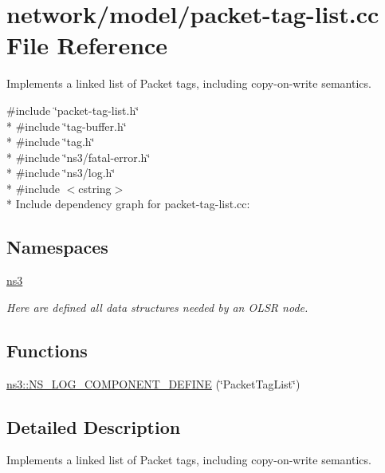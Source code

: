 \hypertarget{packet-tag-list_8cc}{}\section{network/model/packet-\/tag-\/list.cc File Reference}
\label{packet-tag-list_8cc}


Implements a linked list of Packet tags, including copy-\/on-\/write semantics.  


{\ttfamily \#include \char`\"{}packet-\/tag-\/list.\+h\char`\"{}}\\*
{\ttfamily \#include \char`\"{}tag-\/buffer.\+h\char`\"{}}\\*
{\ttfamily \#include \char`\"{}tag.\+h\char`\"{}}\\*
{\ttfamily \#include \char`\"{}ns3/fatal-\/error.\+h\char`\"{}}\\*
{\ttfamily \#include \char`\"{}ns3/log.\+h\char`\"{}}\\*
{\ttfamily \#include $<$cstring$>$}\\*
Include dependency graph for packet-\/tag-\/list.cc\+:
\subsection*{Namespaces}
\begin{DoxyCompactItemize}
\item 
 \hyperlink{namespacens3}{ns3}
\begin{DoxyCompactList}\small\item\em Here are defined all data structures needed by an O\+L\+SR node. \end{DoxyCompactList}\end{DoxyCompactItemize}
\subsection*{Functions}
\begin{DoxyCompactItemize}
\item 
\hyperlink{namespacens3_ab822933083d58fb03db5979a5ba2932a}{ns3\+::\+N\+S\+\_\+\+L\+O\+G\+\_\+\+C\+O\+M\+P\+O\+N\+E\+N\+T\+\_\+\+D\+E\+F\+I\+NE} (\char`\"{}Packet\+Tag\+List\char`\"{})
\end{DoxyCompactItemize}


\subsection{Detailed Description}
Implements a linked list of Packet tags, including copy-\/on-\/write semantics. 

